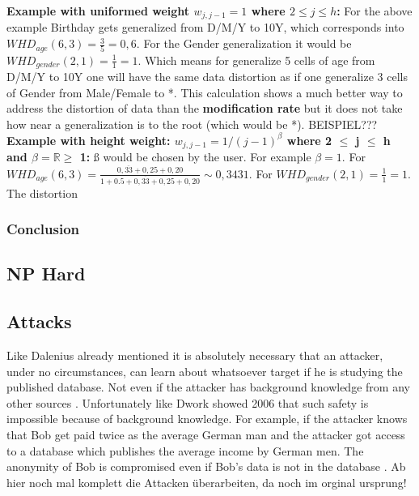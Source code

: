 \documentclass{llncs}
\newcommand{\R}{\mathbb{R}}
\begin{document}
\textbf{Example with uniformed weight $w_{j,j-1} = 1$ where $2\leq j \leq h$:} For the above example Birthday gets generalized from D/M/Y to 10Y, which corresponds into $WHD_{age}(6,3) = \frac{3}{5} = 0,6$. For the Gender generalization it would be $WHD_{gender}(2,1) = \frac{1}{1} = 1$. Which means for generalize 5 cells of age from D/M/Y to 10Y one will have the same data distortion as if one generalize 3 cells of Gender from Male/Female to *. This calculation shows a much better way to address the distortion of data than the \textbf{modification rate} but it does not take how near a generalization is to the root (which would be *). BEISPIEL??? \\

\textbf{Example with height weight: $w_{j,j-1} = 1 / (j-1)^{\beta}$ where 2 $\leq$ j $\leq$ h and $\beta = \R \geq$ 1:}
ß would be chosen by the user. For example $\beta = 1$. For $WHD_{age}(6,3) = \frac{0,\overline{33}+0,25+0,20}{1+0.5+0,\overline{33}+0,25+0,20} \sim 0,3431$. For $WHD_{gender}(2,1) = \frac{1}{1} = 1$. The distortion  

\subsubsection{Conclusion}

\subsection{NP Hard}

\subsection{Attacks}

Like Dalenius already mentioned it is absolutely necessary that an attacker, under no circumstances, can learn about whatsoever target if he is studying the published database. Not even if the attacker has background knowledge from any other sources  \cite{Dalenius1977}. Unfortunately like Dwork showed 2006 that such safety is impossible because of background knowledge. For example, if the attacker knows that Bob get paid twice as the average German man and the attacker got access to a database which publishes the average income by German men. The anonymity of Bob is compromised even if Bob's data is not in the database \cite{dwork2011differential}.  
Ab hier noch mal komplett die Attacken überarbeiten, da noch im orginal ursprung!
\end{document}
